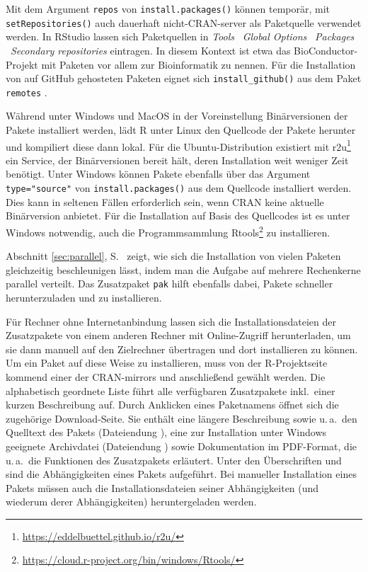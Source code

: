 Mit dem Argument \lstinline!repos! von \lstinline!install.packages()! können temporär, mit \lstinline!setRepositories()! auch dauerhaft nicht-CRAN-server als Paketquelle verwendet werden. In RStudio lassen sich Paketquellen in \emph{Tools} \textrightarrow\ \emph{Global Options} \textrightarrow\ \emph{Packages} \textrightarrow\ \emph{Secondary repositories} eintragen. In diesem Kontext ist etwa das BioConductor-Projekt \cite{Gentleman2004,Huber2015} mit Paketen vor allem zur Bioinformatik zu nennen. Für die Installation von auf GitHub gehosteten Paketen eignet sich \lstinline!install_github()! aus dem Paket \lstinline!remotes! \cite{Hester2019}.

Während unter Windows und MacOS in der Voreinstellung Binärversionen der Pakete installiert werden, lädt R unter Linux den Quellcode der Pakete herunter und kompiliert diese dann lokal. Für die Ubuntu-Distribution existiert mit r2u\footnote{\url{https://eddelbuettel.github.io/r2u/}} ein Service, der Binärversionen bereit hält, deren Installation weit weniger Zeit benötigt. Unter Windows können Pakete ebenfalls über das Argument \lstinline!type="source"! von \lstinline!install.packages()! aus dem Quellcode installiert werden. Dies kann in seltenen Fällen erforderlich sein, wenn CRAN keine aktuelle Binärversion anbietet. Für die Installation auf Basis des Quellcodes ist es unter Windows notwendig, auch die Programmsammlung Rtools\footnote{\url{https://cloud.r-project.org/bin/windows/Rtools/}} zu installieren.

Abschnitt \ref{sec:parallel}, S.\ \pageref{page:par_instpack} zeigt, wie sich die Installation von vielen Paketen gleichzeitig beschleunigen lässt, indem man die Aufgabe auf mehrere Rechenkerne parallel verteilt. Das Zusatzpaket \lstinline!pak! \cite{Csardi2024} hilft ebenfalls dabei, Pakete schneller herunterzuladen und zu installieren.

Für Rechner ohne Internetanbindung lassen sich die Installationsdateien der Zusatzpakete von einem anderen Rechner mit Online-Zugriff herunterladen, um sie dann manuell auf den Zielrechner übertragen und dort installieren zu können. Um ein Paket auf diese Weise zu installieren, muss von der R-Projektseite kommend einer der CRAN-mirrors und anschließend  gewählt werden. Die alphabetisch geordnete Liste führt alle verfügbaren Zusatzpakete inkl.\ einer kurzen Beschreibung auf. Durch Anklicken eines Paketnamens öffnet sich die zugehörige Download-Seite. Sie enthält eine längere Beschreibung sowie u.\,a.\ den Quelltext des Pakets (Dateiendung ), eine zur Installation unter Windows geeignete Archivdatei (Dateiendung ) sowie Dokumentation im PDF-Format, die u.\,a.\ die Funktionen des Zusatzpakets erläutert. Unter den Überschriften  und  sind die Abhängigkeiten eines Pakets aufgeführt. Bei manueller Installation eines Pakets müssen auch die Installationsdateien seiner Abhängigkeiten (und wiederum derer Abhängigkeiten) heruntergeladen werden.

